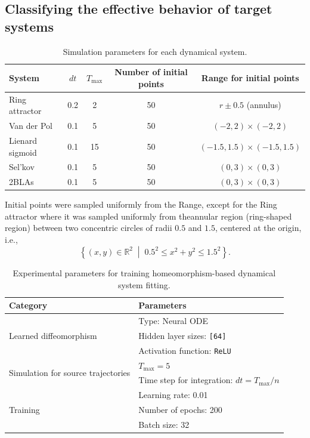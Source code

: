 \documentclass{article}
\theoremstyle{definition} \newtheorem{definition}{Definition}  \newtheorem{example}{Example}
\theoremstyle{remark} \newtheorem{remark}{Remark}
\newcounter{ct}
\begin{document}
\subsection{Classifying the effective behavior of target systems}\label{sec:manytargets_exp_details}
\begin{table}[h!]
\centering
\caption{Simulation parameters for each dynamical system.}
\begin{tabular}{lcccc}
\toprule
\textbf{System} & $dt$ &  $T_{\text{max}}$ & \textbf{Number of initial points} & \textbf{Range for initial points} \\
\midrule
Ring attractor      	&    0.2         &       2        &             50                    &      $r\pm0.5$ (annulus)  \\
Van der Pol          	&    0.1         &       5        &             50                    &       $(-2,2)\times (-2,2)$ \\
Lienard sigmoid    	&    0.1         &      15       &             50                    &        $(-1.5,1.5)\times (-1.5,1.5)$\\
Sel'kov                 	&    0.1         &       5        &             50                    &       $(0,3)\times (0,3)$ \\
2BLAs                  	&    0.1         &       5        &             50                    &       $(0,3)\times (0,3)$ \\
\bottomrule
\end{tabular}
\label{tab:system_params}
\end{table}

Initial points were sampled uniformly from the Range, except for the Ring attractor where it was sampled uniformly from theannular region (ring-shaped region) between two concentric circles of radii $0.5$ and $1.5$, centered at the origin, i.e., 
\[
\left\{ (x, y) \in \mathbb{R}^2 \;\middle|\; 0.5^2 \leq x^2 + y^2 \leq 1.5^2 \right\}.
\]


\begin{table}[h]
\centering
\caption{Experimental parameters for training homeomorphism-based dynamical system fitting.}
\label{tab:training_params}
\begin{tabular}{p{5cm}p{6cm}}
\toprule
\textbf{Category} & \textbf{Parameters} \\
\midrule
\multirow{3}{*}{Learned diffeomorphism} 
    & Type: Neural ODE \\
    & Hidden layer sizes: \texttt{[64]} \\
    & Activation function: \texttt{ReLU} \\
\midrule
\multirow{2}{*}{Simulation for source trajectories} 
    &  $T_{\text{max}} = 5$ \\
    & Time step for integration: $dt = T_{\text{max}}/n$ \\
\midrule
\multirow{3}{*}{Training} 
    & Learning rate: 0.01 \\
    & Number of epochs: 200 \\
    & Batch size: 32 \\
\bottomrule
\end{tabular}
\end{table}
\end{document}
